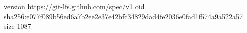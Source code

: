 version https://git-lfs.github.com/spec/v1
oid sha256:e077f089b56ed6a7b2ee2e37e42bfc34829dad4fe2036e0fad1f574a9a522a57
size 1087
